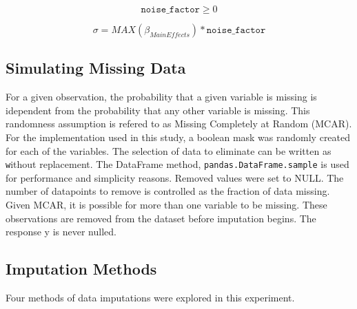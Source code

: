 \documentclass[../paper.tex]{subfiles}
\begin{document}
\begin{equation}\label{eq:noise_factor_def}
  \texttt{noise_factor} \geq 0
\end{equation}

\begin{equation}\label{eq:noise_factor_sigma_def}
  \sigma = MAX(\beta_{Main Effects}) * \texttt{noise_factor}
\end{equation}




\subsection{Simulating Missing Data}
For a given observation, the probability that a given variable is missing is
idependent from the probability that any other variable is missing. This randomness
assumption is refered to as Missing Completely at Random (MCAR). For the implementation
used in this study, a boolean mask was randomly created for each
of the variables. The selection of data to eliminate can be written as
\texttt without replacement.
The DataFrame method, \texttt{pandas.DataFrame.sample} is used for
performance and simplicity reasons. Removed values were set to NULL. The number of
datapoints to remove is controlled as the fraction of data missing. Given MCAR,
it is possible for more than one variable to be missing. These observations are
removed from the dataset before imputation begins. The response y is never
nulled.


\subsection{Imputation Methods}
Four methods of data imputations were explored in this experiment.
\end{document}
